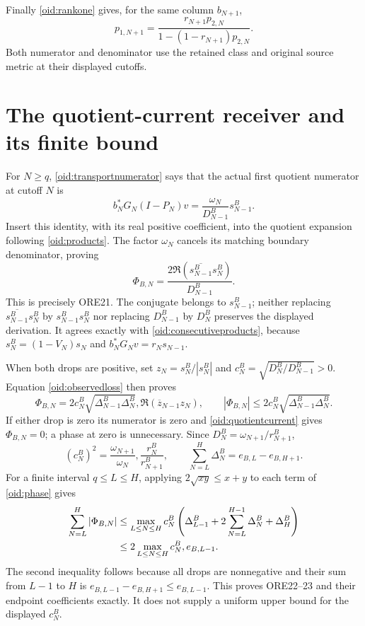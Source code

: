 \documentclass[11pt,a4paper]{article}
\begin{document}
Finally \eqref{oid:rankone} gives, for the same column $b_{N+1}$,
\begin{equation}\label{oid:p1transport}
 p_{1,N+1}=
 \frac{r_{N+1}p_{2,N}}
 {1-(1-r_{N+1})p_{2,N}}.
\end{equation}
Both numerator and denominator use the retained class and original
source metric at their displayed cutoffs.

\section{The quotient-current receiver and its finite bound}

For $N\ge q$, \eqref{oid:transportnumerator} says that the actual
first quotient numerator at cutoff $N$ is
\[
 b_N^*G_N(I-P_N)v
 =\frac{\omega_N}{D_{N-1}^B}s_{N-1}^B.
\]
Insert this identity, with its real positive coefficient, into the
quotient expansion following \eqref{oid:products}. The factor
$\omega_N$ cancels its matching boundary denominator, proving
\begin{equation}\label{oid:quotientcurrent}
 \boxed{\Phi_{B,N}
 =\frac{2\Re(\overline{s_{N-1}^B}s_N^B)}{D_{N-1}^B}.}
\end{equation}
This is precisely ORE21. The conjugate belongs to $s_{N-1}^B$;
neither replacing $\overline{s_{N-1}^B}s_N^B$ by
$s_{N-1}^Bs_N^B$ nor replacing $D_{N-1}^B$ by $D_N^B$
preserves the displayed derivation. It agrees exactly with
\eqref{oid:consecutiveproducts}, because
$s_N^B=(1-V_N)s_N$ and
$b_N^*G_Nv=r_Ns_{N-1}$.

When both drops are positive, set $z_N=s_N^B/|s_N^B|$ and
$c_N^B=\sqrt{D_N^B/D_{N-1}^B}>0$. Equation
\eqref{oid:observedloss} then proves
\begin{equation}\label{oid:phase}
 \Phi_{B,N}=2c_N^B\sqrt{\Delta_{N-1}^B\Delta_N^B},
 \Re(\overline z_{N-1}z_N),\qquad
 |\Phi_{B,N}|\le2c_N^B\sqrt{\Delta_{N-1}^B\Delta_N^B}.
\end{equation}
If either drop is zero its numerator is zero and
\eqref{oid:quotientcurrent} gives $\Phi_{B,N}=0$; a phase at zero
is unnecessary. Since $D_N^B=\omega_{N+1}/r_{N+1}^B$,
\begin{equation}\label{oid:cB}
 (c_N^B)^2=\frac{\omega_{N+1}}{\omega_N},
 \frac{r_N^B}{r_{N+1}^B},\qquad
 \sum_{N=L}^H\Delta_N^B=e_{B,L}-e_{B,H+1}.
\end{equation}
For a finite interval $q\le L\le H$, applying
$2\sqrt{xy}\le x+y$ to each term of \eqref{oid:phase} gives
\begin{align}\label{oid:finitebound}
 \sum_{N=L}^H|\Phi_{B,N}|
 &\le \max_{L\le N\le H}c_N^B
 \left(\Delta_{L-1}^B+2\sum_{N=L}^{H-1}\Delta_N^B+\Delta_H^B\right)
 \notag\\
 &\le 2\max_{L\le N\le H}c_N^B,e_{B,L-1}.
\end{align}
The second inequality follows because all drops are nonnegative and
their sum from $L-1$ to $H$ is $e_{B,L-1}-e_{B,H+1}\le e_{B,L-1}$.
This proves ORE22--23 and their endpoint coefficients exactly. It
does not supply a uniform upper bound for the displayed $c_N^B$.
\end{document}
